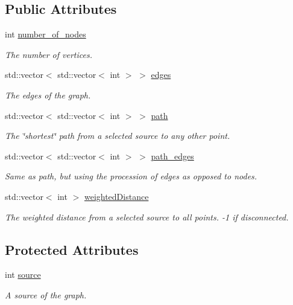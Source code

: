\subsection*{Public Attributes}
\begin{DoxyCompactItemize}
\item 
int \hyperlink{classMackey_1_1Graph_a6b275a20b0571d4b51fbfa3e596cd67a}{number\+\_\+of\+\_\+nodes}
\begin{DoxyCompactList}\small\item\em The number of vertices. \end{DoxyCompactList}\item 
std\+::vector$<$ std\+::vector$<$ int $>$ $>$ \hyperlink{classMackey_1_1Graph_a729ec24b9f9e504f4c4e2d3f6e2cab83}{edges}
\begin{DoxyCompactList}\small\item\em The edges of the graph. \end{DoxyCompactList}\item 
std\+::vector$<$ std\+::vector$<$ int $>$ $>$ \hyperlink{classMackey_1_1Graph_a66fac95e623ca6e3e85ec33310755831}{path}
\begin{DoxyCompactList}\small\item\em The \char`\"{}shortest\char`\"{} path from a selected source to any other point. \end{DoxyCompactList}\item 
std\+::vector$<$ std\+::vector$<$ int $>$ $>$ \hyperlink{classMackey_1_1Graph_ae704812b28d290b7d3742ea3745b5edf}{path\+\_\+edges}
\begin{DoxyCompactList}\small\item\em Same as path, but using the procession of edges as opposed to nodes. \end{DoxyCompactList}\item 
std\+::vector$<$ int $>$ \hyperlink{classMackey_1_1Graph_ab14d4c1bcbe1a994d28a6c590b27ba8b}{weighted\+Distance}
\begin{DoxyCompactList}\small\item\em The weighted distance from a selected source to all points. -\/1 if disconnected. \end{DoxyCompactList}\end{DoxyCompactItemize}
\subsection*{Protected Attributes}
\begin{DoxyCompactItemize}
\item 
int \hyperlink{classMackey_1_1Graph_a43657a07a21a2dcf422876400360ed5b}{source}
\begin{DoxyCompactList}\small\item\em A source of the graph. \end{DoxyCompactList}\end{DoxyCompactItemize}


